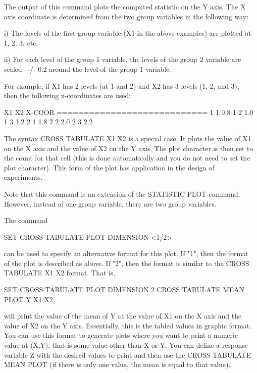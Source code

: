{       The output of this command plots the computed statistic
       on the Y axis.  The X axis coordinate is determined from
       the two group variables in the following way:

        i) The levels of the first group variable (X1 in the above
           examples) are plotted at 1, 2, 3, etc.

       ii) For each level of the group 1 variable, the levels of
           the group 2 variable are scaled +/- 0.2 around the
           level of the group 1 variable.

       For example, if X1 has 2 levels (at 1 and 2) and X2 has
       3 levels (1, 2, and 3), then the following x-coordinates
       are used:

             X1         X2        X-COOR
             ============================
              1          1        0.8
              1          2        1.0
              1          3        1.2
              2          1        1.8
              2          2        2.0
              2          3        2.2

       The syntax CROSS TABULATE X1 X2 is a special case.  It plots
       the value of X1 on the X axis and the value of X2 on the
       Y axis.  The plot character is then set to the count
       for that cell (this is done automatically and you do not need
       to set the plot character).  This form of the plot has
       application in the design of experiments.

       Note that this command is an extension of the STATISTIC PLOT
       command.  However, instead of one group variable, there
       are two group variables.


       The command 

           SET CROSS TABULATE PLOT DIMENSION <1/2>

       can be used to specify an alternative format for this
       plot.  If "1", then the format of the plot is described
       as above.  If "2", then the format is similar to the
       CROSS TABULATE X1 X2 format.  That is,

           SET CROSS TABULATE PLOT DIMENSION 2
           CROSS TABULATE MEAN PLOT Y X1 X2

       will print the value of the mean of Y at the value of X1 on
       the X axis and the value of X2 on the Y axis.   Essentially,
       this is the tabled values in graphic format.  You can
       use this format to generate plots where you want to print
       a numeric value at (X,Y), that is some value other than
       X or Y.  You can define a response variable Z with the
       desired values to print and then use the CROSS TABULATE
       MEAN PLOT (if there is only one value, the mean is equal
       to that value).

}
